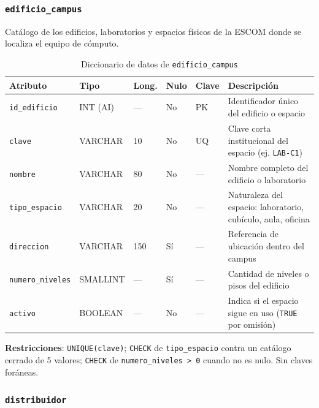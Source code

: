 \documentclass[10pt,a4paper]{article}
\begin{document}
\subsubsection{\texttt{edificio\_campus}}

Catálogo de los edificios, laboratorios y espacios físicos de la ESCOM donde se localiza el equipo de cómputo.

\begin{table}[H]
	\centering
	\footnotesize
	\begin{tabular}{p{2.6cm} | p{1.6cm} | p{0.8cm} | p{0.7cm} | p{1cm} | p{7.7cm}}\hline \hline
		\textbf{Atributo} & \textbf{Tipo} & \textbf{Long.} & \textbf{Nulo} & \textbf{Clave} & \textbf{Descripción} \\ \hline \hline
		\texttt{id\_edificio} & INT (AI) & --- & No & PK & Identificador único del edificio o espacio \\ \hline
		\texttt{clave} & VARCHAR & 10 & No & UQ & Clave corta institucional del espacio (ej. \texttt{LAB-C1}) \\ \hline
		\texttt{nombre} & VARCHAR & 80 & No & --- & Nombre completo del edificio o laboratorio \\ \hline
		\texttt{tipo\_espacio} & VARCHAR & 20 & No & --- & Naturaleza del espacio: laboratorio, cubículo, aula, oficina \\ \hline
		\texttt{direccion} & VARCHAR & 150 & Sí & --- & Referencia de ubicación dentro del campus \\ \hline
		\texttt{numero\_niveles} & SMALLINT & --- & Sí & --- & Cantidad de niveles o pisos del edificio \\ \hline
		\texttt{activo} & BOOLEAN & --- & No & --- & Indica si el espacio sigue en uso (\texttt{TRUE} por omisión) \\ \hline \hline
	\end{tabular}
	\caption{Diccionario de datos de \texttt{edificio\_campus}}
	\label{tabla:dic-edificio}
\end{table}

\textbf{Restricciones}: \texttt{UNIQUE(clave)}; \texttt{CHECK} de \texttt{tipo\_espacio} contra un catálogo cerrado de 5 valores; \texttt{CHECK} de \texttt{numero\_niveles > 0} cuando no es nulo. Sin claves foráneas.

\subsubsection{\texttt{distribuidor}}
\end{document}
